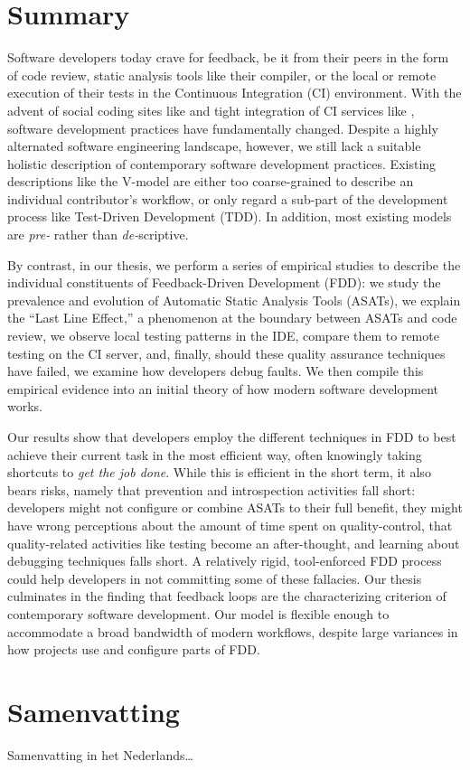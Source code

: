\chapter*{Summary}

Software developers today crave for feedback, be it from their peers in the form of code review,
static analysis tools like their compiler, or the local or remote execution of their tests in the
Continuous Integration (CI) environment. With the advent of social coding sites like \github and
tight integration of CI services like \travis, software development practices have fundamentally
changed.  Despite a highly alternated software engineering landscape, however, we still lack a
suitable holistic description of contemporary software development practices. Existing descriptions
like the V-model are either too coarse-grained to describe an individual contributor's workflow, or
only regard a sub-part of the development process like Test-Driven Development (TDD). In addition,
most existing models are \emph{pre-} rather than \emph{de-}scriptive.

By contrast, in our thesis, we perform a series of empirical studies to describe the individual
constituents of Feedback-Driven Development (FDD): we study the prevalence and evolution of
Automatic Static Analysis Tools (ASATs), we explain the ``Last Line Effect,'' a phenomenon at the
boundary between ASATs and code review, we observe local testing patterns in the IDE, compare them
to remote testing on the CI server, and, finally, should these quality assurance techniques have
failed, we examine how developers debug faults. We then compile this empirical evidence into an
initial theory of how modern software development works.

Our results show that developers employ the different techniques in FDD to best achieve their
current task in the most efficient way, often knowingly taking shortcuts to \emph{get the job
  done}. While this is efficient in the short term, it also bears risks, namely that prevention and
introspection activities fall short: developers might not configure or combine ASATs to their full
benefit, they might have wrong perceptions about the amount of time spent on quality-control, that
quality-related activities like testing become an after-thought, and learning about debugging
techniques falls short. A relatively rigid, tool-enforced FDD process could help developers in not
committing some of these fallacies. Our thesis culminates in the finding that feedback loops are
the characterizing criterion of contemporary software development. Our model is flexible enough to
accommodate a broad bandwidth of modern workflows, despite large variances in how projects use and
configure parts of FDD.

\chapter*{Samenvatting}

{

Samenvatting in het Nederlands\ldots

}

